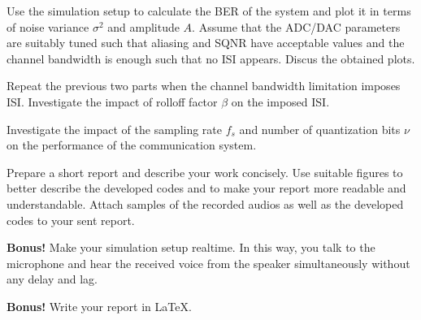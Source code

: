 \documentclass[11pt]{article}
\begin{document}
\begin{question}
\begin{subquestion}
{} 
\end{subquestion}
\begin{subquestion}{Use the simulation setup to calculate the BER of the system and plot it in terms of noise variance $\sigma^2$ and amplitude $A$. Assume that the ADC/DAC parameters are suitably tuned such that aliasing and SQNR have acceptable values and the channel bandwidth is enough such that no ISI appears. Discus the obtained plots.
} 
\end{subquestion}
\begin{subquestion}{Repeat the previous two parts when the channel bandwidth limitation imposes ISI. Investigate the impact of rolloff factor $\beta$ on the imposed ISI.
} 
\end{subquestion}%
\begin{subquestion}{Investigate the impact of the sampling rate $f_s$ and number of quantization bits $\nu$ on the performance of the communication system.
} 
\end{subquestion}
\begin{subquestion}{Prepare a short report and describe your work concisely. Use suitable figures to better describe the developed codes and to make your report more readable and understandable. Attach samples of the recorded audios as well as the developed codes to your sent report. 
} 
\end{subquestion}
\begin{subquestion}{\textbf{Bonus!} Make your simulation setup realtime. In this way, you talk to the microphone and hear the received voice from the speaker simultaneously without any delay and lag. 
} 
\end{subquestion}
\begin{subquestion}{\textbf{Bonus!} Write your report in \LaTeX.
} 
\end{subquestion}
\end{question}
\end{document}
